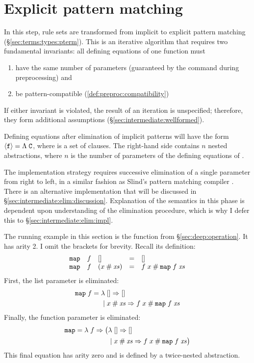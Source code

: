 
\section{Explicit pattern matching}
\label{sec:intermediate:elim}

In this step, rule sets are transformed from implicit to explicit pattern matching (§\ref{sec:terms:types:pterm}).
This is an iterative algorithm that requires two fundamental invariants:
all defining equations of one function must
\begin{enumerate}
  \item have the same number of parameters (guaranteed by the  command during preprocessing) and
  \item be pattern-compatible (\cref{def:preproc:compatibility})
\end{enumerate}
If either invariant is violated, the result of an iteration is unspecified; therefore, they form additional assumptions (§\ref{sec:intermediate:wellformed}).

Defining equations after elimination of implicit patterns will have the form $\left\langle\texttt{\textup{f}}\right\rangle = \Lambda\;\texttt{\textup{C}}$, where \C{} is a set of clauses.
The right-hand side contains $n$ nested abstractions, where $n$ is the number of parameters of the defining equations of .

The implementation strategy requires successive elimination of a single parameter from right to left, in a similar fashion as Slind's pattern matching compiler \cite[§3.3.1]{slind1999terminating}.
There is an alternative implementation that will be discussed in §\ref{sec:intermediate:elim:discussion}.
Explanation of the semantics in this phase is dependent upon understanding of the elimination procedure, which is why I defer this to §\ref{sec:intermediate:elim:impl}.

The running example in this section is the  function from §\ref{sec:deep:operation}.
It has arity 2.
I omit the brackets \embed{} for brevity.
Recall its definition:
\[
  \begin{array}{lllcl}
    \texttt{\textup{map}}&f&[] &=& [] \\
    \texttt{\textup{map}}&f&(x \mathbin{\mathtt{\#}} \mathit{xs}) &=& f\;x \mathbin{\mathtt{\#}} \texttt{\textup{map}}\;f\;\mathit{xs}
  \end{array}
\]
%
First, the list parameter is eliminated:
%
\begin{align*}
  \texttt{\textup{map}}\;f = \lambda\; &[] \Rightarrow [] \\
  |\;&x \mathbin{\mathtt{\#}} \mathit{xs} \Rightarrow f\;x \mathbin{\mathtt{\#}} \texttt{\textup{map}}\;f\;\mathit{xs}
\end{align*}
%
Finally, the function parameter is eliminated:
%
\begin{align*}
  \texttt{\textup{map}} = \lambda\; f \Rightarrow \big(\lambda\; &[] \Rightarrow [] \\
  |\;&x \mathbin{\mathtt{\#}} \mathit{xs} \Rightarrow f\;x \mathbin{\mathtt{\#}} \texttt{\textup{map}}\;f\;\mathit{xs}\big)
\end{align*}
%
This final equation has arity zero and is defined by a twice-nested abstraction.

